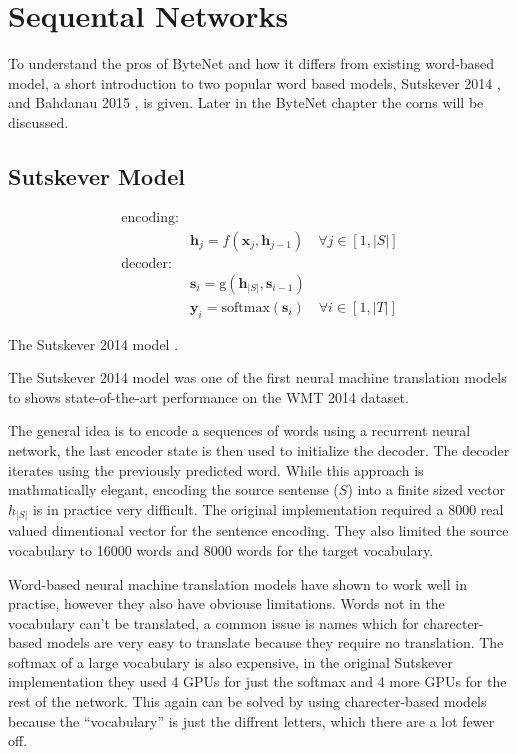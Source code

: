 \section{Sequental Networks}


To understand the pros of ByteNet and how it differs from existing word-based model, a short introduction to two popular word based models, Sutskever 2014 \cite{sutskever-2014-nmt}, and Bahdanau 2015 \cite{bahdanau-2015-nmt}, is given. Later in the ByteNet chapter the corns will be discussed. 

\subsection{Sutskever Model}

\begin{equationbox}[H]
\begin{equation*}
\begin{aligned}
\text{encoding:} & \\
& \mathbf{h}_j = f(\mathbf{x}_j, \mathbf{h}_{j-1}) \quad \forall j \in [1, |S|] \\
\text{decoder:} & \\
&\mathbf{s}_i = \mathrm{g}(\mathbf{h}_{|S|}, \mathbf{s}_{i-1}) \\
&\mathbf{y}_i = \mathrm{softmax}(\mathbf{s}_i) \quad \forall i \in [1, |T|] 
\end{aligned}
\end{equation*}
\caption{The Sutskever 2014 model \cite{sutskever-2014-nmt}.}
\end{equationbox}

The Sutskever 2014 model \cite{sutskever-2014-nmt} was one of the first neural machine translation models to shows state-of-the-art performance on the WMT 2014 dataset.

The general idea is to encode a sequences of words using a recurrent neural network, the last encoder state is then used to initialize the decoder. The decoder iterates using the previously predicted word. While this approach is mathmatically elegant, encoding the source sentense ($S$) into a finite sized vector $h_{|S|}$ is in practice very difficult. The original implementation required a 8000 real valued dimentional vector for the sentence encoding. They also limited the source vocabulary to 16000 words and 8000 words for the target vocabulary.

Word-based neural machine translation models have shown to work well in practise, however they also have obviouse limitations. Words not in the vocabulary can't be translated, a common issue is names which for charecter-based models are very easy to translate because they require no translation. The softmax of a large vocabulary is also expensive, in the original Sutskever implementation they used 4 GPUs for just the softmax and 4 more GPUs for the rest of the network. This again can be solved by using charecter-based models because the ``vocabulary'' is just the diffrent letters, which there are a lot fewer off.

